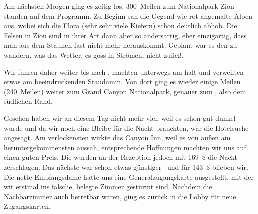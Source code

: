 Am nächsten Morgen ging es zeitig los, 300~Meilen zum Nationalpark Zion standen auf dem Programm.
Zu Beginn sah die Gegend wie rot angemalte Alpen aus, wobei sich die Flora (sehr sehr viele Kiefern) schon deutlich abhob.
Die Felsen in Zion sind in ihrer Art dann aber so andersartig, eher einzigartig, dass man aus dem Staunen fast nicht mehr herauskommt.
Geplant war es den  zu wandern, was das Wetter, es goss in Strömen, nicht zuließ.

Wir fuhren daher weiter bis nach , machten unterwegs am  halt und verweilten etwas am beeindruckenden  Staudamm.
Von dort ging es wieder einige Meilen (240~Meilen) weiter zum Grand Canyon Nationalpark, genauer zum , also dem südlichen Rand.

Gesehen haben wir an diesem Tag nicht mehr viel, weil es schon gut dunkel wurde und da wir noch eine Bleibe für die Nacht brauchten, war die Hotelsuche angesagt.
Am verlockensten wirkte das Canyon Inn, weil es von außen am heruntergekommensten aussah, entsprechende Hoffnungen machten wir uns auf einen guten Preis.
Die wurden an der Rezeption jedoch mit 169~\$ die Nacht zerschlagen.
Das nächste war schon etwas \glqq günstiger \grqq\, und für 143~\$ blieben wir.
Die nette Empfangsdame hatte uns eine Generalzugangskarte ausgestellt, mit der wir erstmal ins falsche, belegte Zimmer gestürmt sind.
Nachdem die Nachbarzimmer auch betretbar waren, ging es zurück in die Lobby für neue Zugangskarten.
